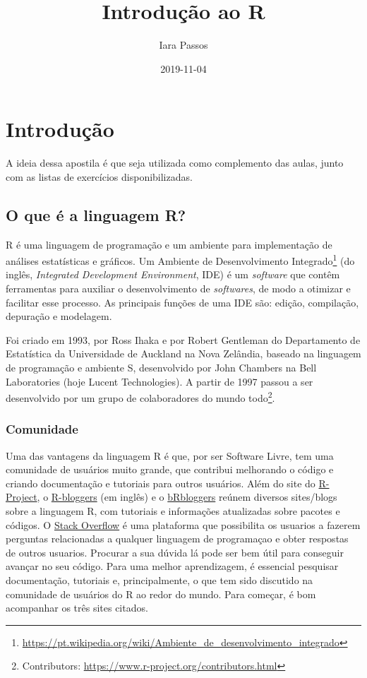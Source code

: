 \documentclass[]{book}
\title{Introdução ao R}
\author{Iara Passos}
\date{2019-11-04}
\let\rmarkdownfootnote\footnote%
\def\footnote{\protect\rmarkdownfootnote}
\theoremstyle{definition}
\theoremstyle{definition}
\theoremstyle{definition}
\theoremstyle{remark}
\begin{document}
\maketitle

{
\setcounter{tocdepth}{1}
\tableofcontents
}
\hypertarget{intro}{%
\chapter{Introdução}\label{intro}}

A ideia dessa apostila é que seja utilizada como complemento das aulas, junto com as listas de exercícios disponibilizadas.

\hypertarget{o-que-uxe9-a-linguagem-r}{%
\section{O que é a linguagem R?}\label{o-que-uxe9-a-linguagem-r}}

R é uma linguagem de programação e um ambiente para implementação de análises estatísticas e gráficos. Um Ambiente de Desenvolvimento Integrado\footnote{\url{https://pt.wikipedia.org/wiki/Ambiente_de_desenvolvimento_integrado}} (do inglês, \emph{Integrated Development Environment}, IDE) é um \emph{software} que contêm ferramentas para auxiliar o desenvolvimento de \emph{softwares}, de modo a otimizar e facilitar esse processo. As principais funções de uma IDE são: edição, compilação, depuração e modelagem.

Foi criado em 1993, por Ross Ihaka e por Robert Gentleman do Departamento de Estatística da Universidade de Auckland na Nova Zelândia, baseado na linguagem de programação e ambiente S, desenvolvido por John Chambers na Bell Laboratories (hoje Lucent Technologies). A partir de 1997 passou a ser desenvolvido por um grupo de colaboradores do mundo todo\footnote{Contributors: \url{https://www.r-project.org/contributors.html}}.

\hypertarget{comunidade}{%
\subsection{Comunidade}\label{comunidade}}

Uma das vantagens da linguagem R é que, por ser Software Livre, tem uma comunidade de usuários muito grande, que contribui melhorando o código e criando documentação e tutoriais para outros usuários. Além do site do \href{https://www.r-project.org/}{R-Project}, o \href{https://www.r-bloggers.com/}{R-bloggers} (em inglês) e o \href{https://brbloggers.com.br/}{bRbloggers} reúnem diversos sites/blogs sobre a linguagem R, com tutoriais e informações atualizadas sobre pacotes e códigos. O \href{https://stackoverflow.com/questions/tagged/r}{Stack Overflow} é uma plataforma que possibilita os usuarios a fazerem perguntas relacionadas a qualquer linguagem de programaçao e obter respostas de outros usuarios. Procurar a sua dúvida lá pode ser bem útil para conseguir avançar no seu código. Para uma melhor aprendizagem, é essencial pesquisar documentação, tutoriais e, principalmente, o que tem sido discutido na comunidade de usuários do R ao redor do mundo. Para começar, é bom acompanhar os três sites citados.
\end{document}
